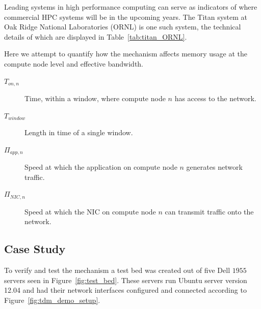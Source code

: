 \documentclass[oneside,12pt]{memoir}
\begin{document}
Leading systems in high performance computing can serve as indicators of where commercial HPC systems will be in the upcoming years. The Titan system at Oak Ridge National Laboratories (ORNL) is one such system, the technical details of which are displayed in Table~\ref{tab:titan_ORNL}.

Here we attempt to quantify how the mechanism affects memory usage at the compute node level and effective bandwidth.
\begin{description}
    \item[$T_{on, n}$] Time, within a window, where compute node $n$ has access to the network.
    \item[$T_{window}$] Length in time of a single window.
    \item[$\Pi_{app, n}$] Speed at which the application on compute node $n$ generates network traffic.
    \item[$\Pi_{NIC, n}$] Speed at which the NIC on compute node $n$ can transmit traffic onto the network.
\end{description} 

\subsection{Case Study}
To verify and test the mechanism a test bed was created out of five Dell $1955$ servers seen in Figure~\ref{fig:test_bed}. These servers run Ubuntu server version 12.04 and had their network interfaces configured and connected according to Figure~\ref{fig:tdm_demo_setup}. 
\end{document}
